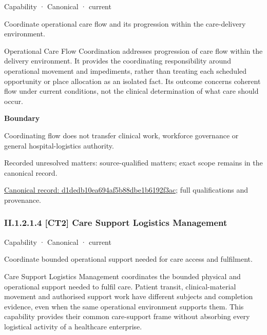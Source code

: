 \label{element:d1dedb10ea694af5b88dbe1b6192f3ac}
{\small Capability · Canonical · current}\par

Coordinate operational care flow and its progression within the care-delivery environment.



Operational Care Flow Coordination addresses progression of care flow within the delivery environment. It provides the coordinating responsibility around operational movement and impediments, rather than treating each scheduled opportunity or place allocation as an isolated fact. Its outcome concerns coherent flow under current conditions, not the clinical determination of what care should occur.



\textbf{Boundary}



Coordinating flow does not transfer clinical work, workforce governance or general hospital-logistics authority.


{\small Recorded unresolved matters: source-qualified matters; exact scope remains in the canonical record.}\par
{\footnotesize \href{../../../../../../../continuum/strategy/capability/d1dedb10ea694af5b88dbe1b6192f3ac.md}{Canonical record: d1dedb10ea694af5b88dbe1b6192f3ac}; full qualifications and provenance.}\par
\subsubsection*{II.1.2.1.4 [CT2] Care Support Logistics Management}
\label{navigation:II.1.2.1.4}

\label{element:92be036674254f719cf4bb613120128a}
{\small Capability · Canonical · current}\par

Coordinate bounded operational support needed for care access and fulfilment.



Care Support Logistics Management coordinates the bounded physical and operational support needed to fulfil care. Patient transit, clinical-material movement and authorised support work have different subjects and completion evidence, even when the same operational environment supports them. This capability provides their common care-support frame without absorbing every logistical activity of a healthcare enterprise.



